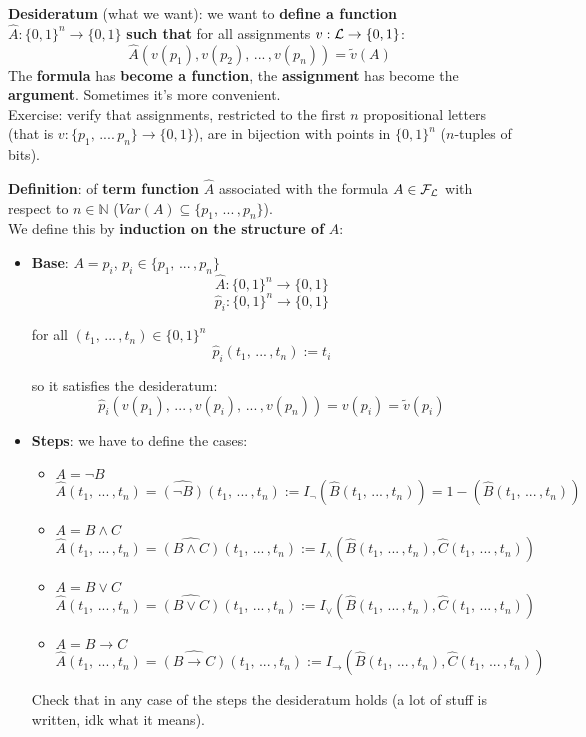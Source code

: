 \documentclass[11pt]{article}
\begin{document}
	\textbf{Desideratum} (what we want): we want to \textbf{define a function} $\hat{A}: \{0,1\}^n \rightarrow \{0,1\}$ \textbf{such that} for all assignments $v: \mathcal{L} \rightarrow \{0,1\}$: 
	$$ \hat{A} (v(p_1), v(p_2), \, ... \, , v(p_n)) = \tilde{v} (A) $$
	The \textbf{formula} has \textbf{become a function}, the \textbf{assignment} has become the \textbf{argument}. Sometimes it's more convenient.\\
	
	Exercise: verify that assignments, restricted to the first $n$ propositional letters (that is $v: \{p_1, \, .... \, p_n\} \rightarrow \{0,1\}$), are in bijection with points in $\{0,1\}^n$ ($n$-tuples of bits).\\
	
	\newpage
	
	\textbf{Definition}: of \textbf{term function} $\hat{A}$ associated with the formula $A \in \mathcal{F}_\mathcal{L}$ with respect to $n \in \mathbb{N}$ ($Var(A) \subseteq \{p_1, \, ... \, , p_n\}$).\\
	
	We define this by \textbf{induction on the structure of} $A$:
	\begin{itemize}
		\item \textbf{Base}: $A = p_i$, $p_i \in \{p_1, \, ... \, , p_n\}$
		$$ \hat{A}: \{0,1\}^n \rightarrow \{0,1\}$$
		$$ \hat{p}_i: \{0,1\}^n \rightarrow \{0,1\}$$
		
		for all $(t_1, \, ... \, , t_n) \in \{0,1\}^n$
		$$ \hat{p}_i (t_1, \, ... \, , t_n) :=  t_i $$
		
		so it satisfies the desideratum: 
		$$ \hat{p}_i (v(p_1), \, ... \, , v(p_i), \, ... \, , v(p_n)) = v(p_i) = \tilde{v} (p_i) $$
		
		\item \textbf{Steps}: we have to define the cases: 	
		\begin{itemize}
			\item $A = \neg B$
			$$ \hat{A} (t_1, \, ... \, , t_n) = \hat{(\neg B)} (t_1, \, ... \, , t_n) := I_\neg (\hat B (t_1, \, ... \, , t_n)) =  1 - (\hat B (t_1, \, ... \, , t_n))$$
			
			\item $A = B \wedge C$ 
			$$ \hat{A} (t_1, \, ... \, , t_n) =  \hat{(B \wedge C)} (t_1, \, ... \, , t_n) := I_\wedge (\hat B (t_1, \, ... \, , t_n), \hat C (t_1, \, ... \, , t_n))$$
			
			\item $A = B \vee C$ 
			$$ \hat{A} (t_1, \, ... \, , t_n) =  \hat{(B \vee C)} (t_1, \, ... \, , t_n) := I_\vee (\hat B (t_1, \, ... \, , t_n), \hat C (t_1, \, ... \, , t_n))$$
			
			\item $A = B \rightarrow C$ 
			$$ \hat{A} (t_1, \, ... \, , t_n) =  \hat{(B \rightarrow C)} (t_1, \, ... \, , t_n) := I_\rightarrow (\hat B (t_1, \, ... \, , t_n), \hat C (t_1, \, ... \, , t_n))$$
		\end{itemize}
		
		Check that in any case of the steps the desideratum holds (a lot of stuff is written, idk what it means).
	\end{itemize}
	
\end{document}
